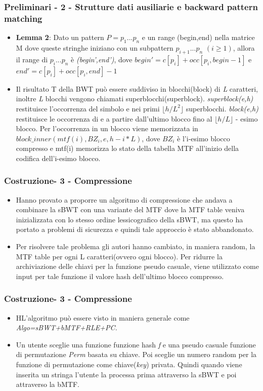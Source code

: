 \documentclass{beamer}
\begin{document}
\begin{frame}
\frametitle{Preliminari - 2 - Strutture dati ausiliarie e backward pattern matching}
\begin{itemize}
	\item \textbf{Lemma 2}:  Dato un pattern  $ P = p_{1}...p_{n} $  e un range (begin,end) nella matrice M dove queste stringhe iniziano con un subpattern $ p_{i+1}...p_{n} $ $ (i \geq  1) $, allora il range di $ p_{i}...p_{n} $ è \textit{(begin',end')}, dove $ begin' = c[p_{i}]+occ[p_{i},begin-1] $ e $ end' = c[p_{i}]+occ[p_{i},end] -1 $
	\item Il risultato T della BWT può essere suddiviso in blocchi(block) di \textit{L} caratteri, inoltre \textit{L} blocchi vengono chiamati superblocchi(superblock). \textit{superblock(e,h)} restituisce l'occorrenza del simbolo e nei primi $ \lfloor h/L^{2} \rfloor $ superblocchi. \textit{block(e,h)} restituisce le occorrenza di e a partire dall’ultimo blocco fino al  $ \lfloor h/L \rfloor $ - esimo blocco. Per l'occorrenza in un blocco viene memorizzata in $ block\_inner(mtf(i),BZ_{i},e,h-i*L) $, dove $ BZ_{i} $ è l’i-esimo blocco compresso e mtf(i) memorizza lo stato della tabella MTF all’inizio della codifica dell'i-esimo blocco.	
\end{itemize}
\end{frame}

\begin{frame}
\frametitle{Costruzione- 3 - Compressione}
	\begin{itemize}
		\item Hanno provato a proporre un algoritmo di compressione che andava a combinare la sBWT con una variante del MTF dove la MTF table veniva inizializzata con lo stesso ordine lessicografico della sBWT, ma questo ha portato a problemi di sicurezza e quindi tale approccio è stato abbandonato.
		\item Per risolvere tale problema gli autori hanno cambiato, in maniera random, la MTF table per ogni L caratteri(ovvero ogni blocco). Per ridurre la archiviazione delle chiavi per la funzione pseudo casuale, viene utilizzato come input per tale funzione il valore hash dell'ultimo blocco compresso.
	\end{itemize}
\end{frame}

\begin{frame}
\frametitle{Costruzione- 3 - Compressione}
\begin{itemize}
	\item HL’algoritmo può essere visto in maniera generale come \textit{Algo=sBWT+bMTF+RLE+PC.}
	\item Un utente sceglie una funzione funzione hash \textit{f} e una pseudo casuale funzione di permutazione \textit{Perm} basata su chiave. Poi sceglie un numero random per la funzione di permutazione come chiave(\textit{key}) privata. Quindi quando viene inserita un stringa l’utente la processa prima attraverso la sBWT e poi attraverso la bMTF. 
\end{itemize}
\end{frame}
\end{document}
